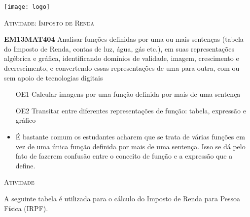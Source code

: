 \documentclass[10 pt,usenames,dvipsnames, oneside]{article}
\begin{document}
\begin{center}
  \begin{minipage}[l]{3cm}
\texttt{[image: logo]}    
\end{minipage}\hfill
\begin{minipage}[r]{.8\textwidth}
 {\Large \scshape Atividade: Imposto de Renda}  
\end{minipage}
\end{center}
\vspace{.2cm}

\ifdefined\prof
\begin{objetivos}
\item \textbf{EM13MAT404} Analisar funções definidas por uma ou mais sentenças (tabela do Imposto de Renda, contas de luz, água, gás etc.), em suas representações algébrica e gráfica, identificando domínios de validade, imagem, crescimento e decrescimento, e convertendo essas representações de uma para outra, com ou sem apoio de tecnologias digitais
\end{objetivos}

\begin{goals}
\begin{enumerate}

\item [OE1] Calcular imagens por uma função definida por mais de uma sentença

\item [OE2] Transitar entre diferentes representações de função: tabela, expressão e gráfico

\end{enumerate}

\tcblower

\begin{itemize}
\item É bastante comum os estudantes acharem que se trata de várias funções em vez de uma única função definida por mais de uma sentença. Isso se dá pelo fato de fazerem confusão entre o conceito de função e a expressão que a define.
\end{itemize}

\end{goals}

\bigskip
\begin{center}
{\large \scshape Atividade}
\end{center}
\fi

A seguinte tabela é utilizada para o cálculo do Imposto de Renda para Pessoa Física (IRPF).
\end{document}
